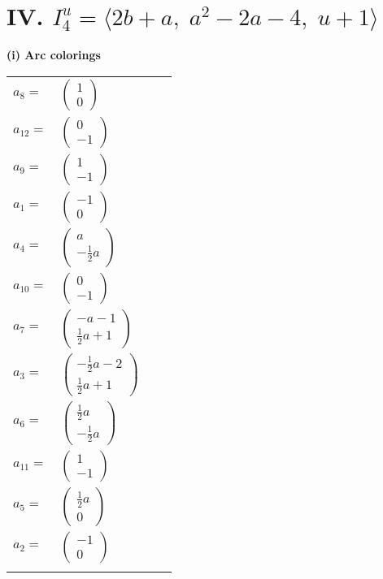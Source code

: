 \documentclass[1p]{elsarticle_modified}
\theoremstyle{definition}
\begin{document}
\centering \section*{IV. $I^u_{4}= \langle 2 b+a,\;a^2-2 a-4,\;u+1 \rangle$}
\flushleft \textbf{(i) Arc colorings}\\
\begin{tabular}{m{7pt} m{180pt} m{7pt} m{180pt} }
\flushright $a_{8}=$&$\begin{pmatrix}1\\0\end{pmatrix}$ \\
\flushright $a_{12}=$&$\begin{pmatrix}0\\-1\end{pmatrix}$ \\
\flushright $a_{9}=$&$\begin{pmatrix}1\\-1\end{pmatrix}$ \\
\flushright $a_{1}=$&$\begin{pmatrix}-1\\0\end{pmatrix}$ \\
\flushright $a_{4}=$&$\begin{pmatrix}a\\-\frac{1}{2} a\end{pmatrix}$ \\
\flushright $a_{10}=$&$\begin{pmatrix}0\\-1\end{pmatrix}$ \\
\flushright $a_{7}=$&$\begin{pmatrix}- a-1\\\frac{1}{2} a+1\end{pmatrix}$ \\
\flushright $a_{3}=$&$\begin{pmatrix}-\frac{1}{2} a-2\\\frac{1}{2} a+1\end{pmatrix}$ \\
\flushright $a_{6}=$&$\begin{pmatrix}\frac{1}{2} a\\-\frac{1}{2} a\end{pmatrix}$ \\
\flushright $a_{11}=$&$\begin{pmatrix}1\\-1\end{pmatrix}$ \\
\flushright $a_{5}=$&$\begin{pmatrix}\frac{1}{2} a\\0\end{pmatrix}$ \\
\flushright $a_{2}=$&$\begin{pmatrix}-1\\0\end{pmatrix}$\\&\end{tabular}
\end{document}
